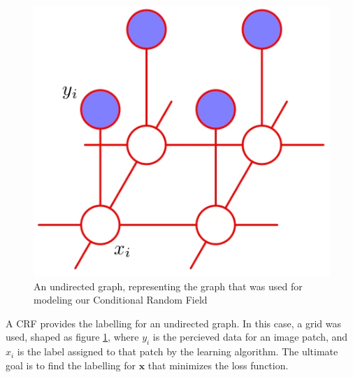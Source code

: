 \begin{figure}
		\includegraphics[width=.3\textwidth]{resources/crf}
		\caption{An undirected graph, representing the graph that was used for
		modeling our Conditional Random Field}
		\label{fig:crf}
\end{figure}
A CRF provides the labelling for an undirected graph. In this case, a grid was
used, shaped as figure \ref{fig:crf}, where $y_i$ is the percieved data for an
image patch, and $x_i$ is the label assigned to that patch by the learning
algorithm. The ultimate goal is to find the labelling for $\mathbf{x}$ that
minimizes the loss function. 

